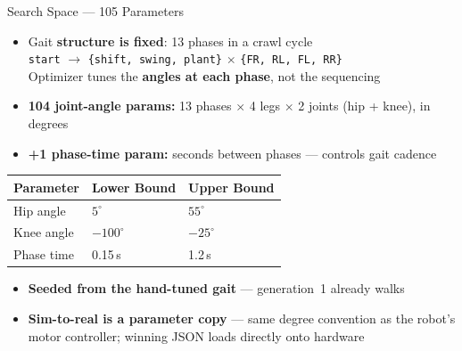\documentclass[aspectratio=169]{beamer}
\begin{document}
\begin{frame}{Search Space --- 105 Parameters}
\begin{itemize}
    \item Gait \textbf{structure is fixed}: 13 phases in a crawl cycle\\
          \texttt{start} $\to$ \texttt{\{shift, swing, plant\}} $\times$ \texttt{\{FR, RL, FL, RR\}}\\
          Optimizer tunes the \textbf{angles at each phase}, not the sequencing
    \item \textbf{104 joint-angle params:} 13 phases $\times$ 4 legs $\times$ 2 joints (hip + knee), in degrees
    \item \textbf{+1 phase-time param:} seconds between phases --- controls gait cadence
\end{itemize}

\vspace{0.3em}
\begin{tabular}{lll}
    \toprule
    Parameter & Lower Bound & Upper Bound \\
    \midrule
    Hip angle       & $5^\circ$   & $55^\circ$ \\
    Knee angle      & $-100^\circ$ & $-25^\circ$ \\
    Phase time      & 0.15\,s     & 1.2\,s \\
    \bottomrule
\end{tabular}

\vspace{0.3em}
\begin{itemize}
    \item \textbf{Seeded from the hand-tuned gait} --- generation~1 already walks
    \item \textbf{Sim-to-real is a parameter copy} --- same degree convention as the robot's motor controller; winning JSON loads directly onto hardware
\end{itemize}
\end{frame}
\end{document}

